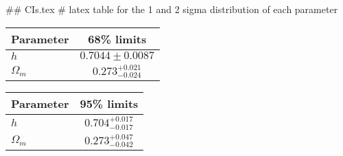## CIs.tex
# latex table for the 1 and 2 sigma distribution of each parameter

\begin{tabular} { l  c}
 Parameter &  68\% limits\\
\hline
{\boldmath$h              $} & $0.7044\pm 0.0087          $\\
{\boldmath$\Omega_m       $} & $0.273^{+0.021}_{-0.024}   $\\
\hline
\end{tabular}

\begin{tabular} { l  c}
 Parameter &  95\% limits\\
\hline
{\boldmath$h              $} & $0.704^{+0.017}_{-0.017}   $\\
{\boldmath$\Omega_m       $} & $0.273^{+0.047}_{-0.042}   $\\
\hline
\end{tabular}

